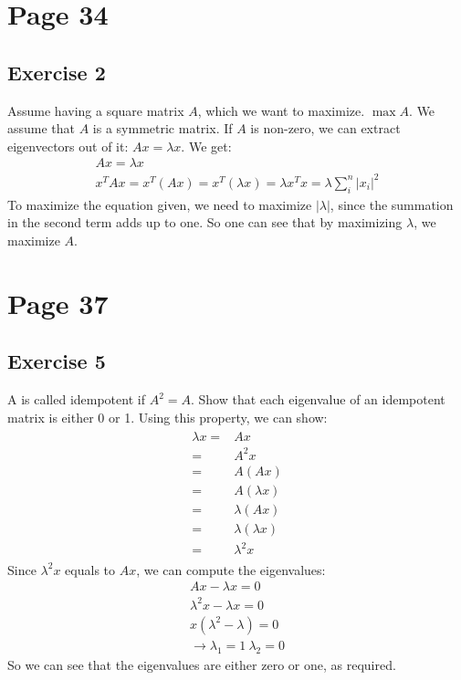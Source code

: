 \section{Page 34}
\subsection{Exercise 2}
Assume having a square matrix $A$, which we want to maximize. $\max  A$. We assume that $A$ is a symmetric matrix.
If $A$ is non-zero, we can extract eigenvectors out of it: $ A x = \lambda x$.
We get:
\begin{gather*}
A x = \lambda x \\
x^T A x = x^T (A x) = x^T (\lambda x) = \lambda x^T x = \lambda \sum\limits_i^n | x_i | ^2
\end{gather*}
To maximize the equation given, we need to maximize $|\lambda|$, since the summation in the second term adds up to one.
So one can see that by maximizing $\lambda$, we maximize $A$.


\section{Page 37}
\subsection{Exercise 5}
A is called idempotent if $A^2 = A$. Show that each eigenvalue of an idempotent matrix is either 0 or 1.
Using this property, we can show:
\begin{gather*}
\begin{array}{cc}
\lambda x =& A x \\
=&  A^2 x \\
=& A(A x) \\
=& A(\lambda x)\\
=& \lambda (A x)\\
=& \lambda (\lambda x)\\
=& \lambda^2 x
\end{array}
\end{gather*}
Since $\lambda^2 x$ equals to $A x$, we can compute the eigenvalues:
\begin{gather*}
A x - \lambda x = 0 \\
\lambda^2 x - \lambda x = 0\\
x( \lambda ^2 - \lambda ) =0 \\
\rightarrow \lambda_1 = 1 \ \lambda_2 = 0
\end{gather*}
So we can see that the eigenvalues are either zero or one, as required.
